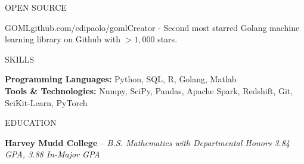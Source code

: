 \documentclass{resume} %
\begin{document}

\begin{rSection}{OPEN SOURCE}

\begin{rSubsection}{GOML}{\textsf{github.com/cdipaolo/goml}}{Creator - Second most starred Golang machine learning library on Github with $> 1,000$ stars.}

\item[]
\vspace{-2.5em}

\end{rSubsection}

\end{rSection}


\begin{rSection}{SKILLS}

\textbf{Programming Languages:} Python, SQL, R, Golang, Matlab\\[0em]
\textbf{Tools \& Technologies:} Numpy, SciPy, Pandas, Apache Spark, Redshift, Git, SciKit-Learn, PyTorch

\end{rSection}


\begin{rSection}{EDUCATION}

{{\bf Harvey Mudd College} -- {\it B.S. Mathematics with Departmental Honors}} \hfill {\em 3.84 GPA, 3.88 In-Major GPA}\\[-1.75em]

\end{rSection}
\end{document}
